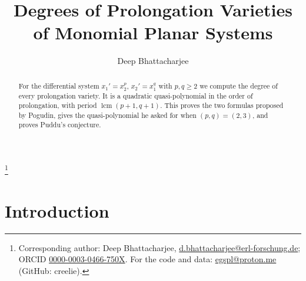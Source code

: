 \documentclass[11pt]{amsart}
\theoremstyle{definition}
\theoremstyle{remark}
\numberwithin{equation}{section}
\DeclareMathOperator{\lcm}{lcm}
\begin{document}
\title{Degrees of Prolongation Varieties of Monomial Planar Systems}

\author{Deep Bhattacharjee}
\address{Formerly, Electro-Gravitational Space Propulsion Laboratory (EGSPL),\newline Bhubaneswar, Odisha 751030, India\newline
Formerly, University of Calcutta (Heramba Chandra College),/49 Gariahat Road, Golpark, Kolkata 700029, West Bengal, India}
\thanks{Corresponding author: Deep Bhattacharjee, \href{mailto:d.bhattacharjee@erl-forschung.de}{d.bhattacharjee@erl-forschung.de}; ORCID \href{https://orcid.org/0000-0003-0466-750X}{\mbox{0000-0003-0466-750X}}. For the code and data: \href{mailto:egspl@proton.me}{egspl@proton.me} (GitHub: creelie).}


\begin{abstract}
For the differential system $x_1'=x_2^p$, $x_2'=x_1^q$ with $p,q\ge2$ we compute the degree of every prolongation variety. It is a quadratic quasi-polynomial in the order of prolongation, with period $\lcm(p+1,q+1)$. This proves the two formulas proposed by Pogudin, gives the quasi-polynomial he asked for when $(p,q)=(2,3)$, and proves Puddu's conjecture.
\end{abstract}

\maketitle

\section{Introduction}\label{sec:intro}
\end{document}
